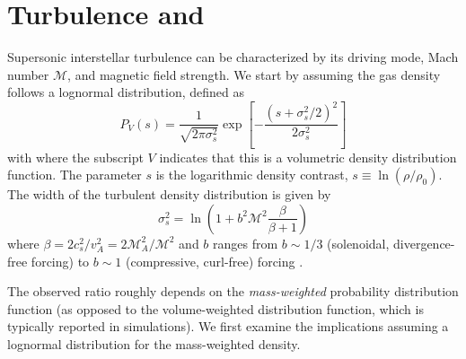 %



\section{Turbulence and \formaldehyde}
Supersonic interstellar turbulence can be characterized by its driving mode,
Mach number $\mathcal{M}$, and magnetic field strength. 
We start by assuming the gas density follows a lognormal distribution, defined
as \citep{Padoan2011b,Molina2012a}
\begin{equation}
    \label{eqn:lognormal}
    P_V(s) = \frac{1}{\sqrt{2 \pi \sigma_s^2}} \exp\left[-\frac{(s+\sigma_s^2/2)^2}{2 \sigma_s^2}\right]
\end{equation}
with where the subscript $V$ indicates that this is a volumetric density
distribution function.  The parameter $s$ is the logarithmic
density contrast, $s\equiv\ln(\rho/\rho_0)$.
The width of the turbulent density distribution
is given by
\begin{equation}
    \label{eqn:sigmas}
    \sigma_s^2 = \ln\left(1+b^2 \mathcal{M}^2 \frac{\beta}{\beta+1}\right)
\end{equation}
where $\beta= 2 c_s^2/v_A^2 = 2 \mathcal{M}_A^2/\mathcal{M}^2$ and $b$ ranges
from $b\sim1/3$ (solenoidal, divergence-free forcing) to $b\sim1$ (compressive, curl-free)
forcing \citep{Federrath2010a}.  


The observed \formaldehyde ratio roughly depends on the \emph{mass-weighted}
probability distribution function (as opposed to the volume-weighted
distribution function, which is typically reported in simulations).  We first
examine the implications assuming a lognormal distribution for the
mass-weighted density.

